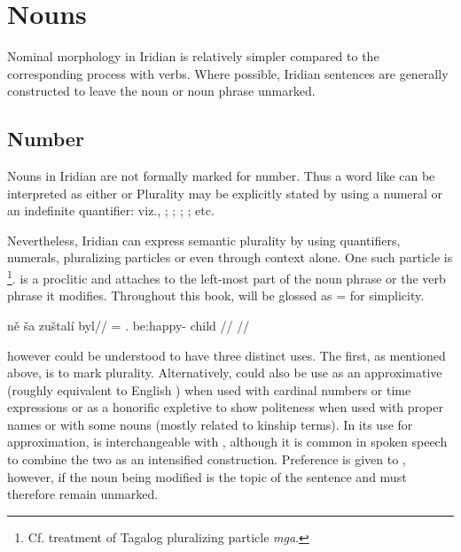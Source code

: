 \chapter{Nouns}

Nominal morphology in Iridian is relatively simpler compared to the
corresponding process with verbs. Where possible, Iridian sentences are
generally constructed to leave the noun or noun phrase unmarked.

\section{Number}\label{sec:number}

Nouns in Iridian are not formally marked for number. Thus a word like
 can be interpreted as either  or 
Plurality may be explicitly stated by using a numeral or an indefinite
quantifier: viz., ; ;
; ; etc.



Nevertheless, Iridian can express semantic plurality by using quantifiers,
numerals, pluralizing particles or even through context alone. One such particle
is \label{sec:plurals}\footnote{Cf.  treatment
of Tagalog pluralizing particle \emph{mga}.}.  is a
proclitic and attaches to the left-most part of the noun phrase or the verb
phrase it modifies. Throughout this book,  will be glossed as \Pl{}= for
simplicity.

\pex
\begingl
    \gla ně ša zuštalí byl//
    \glb \Pl{}= \Dem{}.\Prox{} be:happy-\Att{} child //
    \glft {}//
\endgl
\xe

 however could be understood to have three distinct uses. The first, as
mentioned above, is to mark plurality. Alternatively,  could also be use
as an approximative (roughly equivalent to English
) when used with cardinal numbers or time expressions or as a
honorific expletive to show politeness when
used with proper names or with some nouns (mostly related to
kinship terms). In its use for approximation,  is
interchangeable with , although it is common in spoken speech to
combine the two as an intensified construction. Preference is given to ,
however, if the noun being modified is the topic of the sentence and must
therefore remain unmarked.

